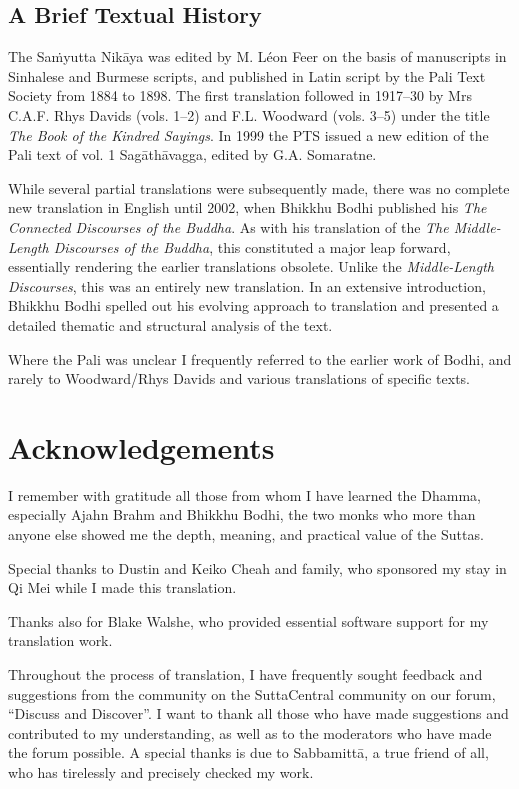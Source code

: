 \documentclass[12pt,openany]{book}%
\begin{document}
\section*{A Brief Textual History}

The \textsanskrit{Saṁyutta} \textsanskrit{Nikāya} was edited by M. Léon Feer on the basis of manuscripts in Sinhalese and Burmese scripts, and published in Latin script by the Pali Text Society from 1884 to 1898. The first translation followed in 1917–30 by Mrs C.A.F. Rhys Davids (vols. 1–2) and F.L. Woodward (vols. 3–5) under the title \textit{The Book of the Kindred Sayings}. In 1999 the PTS issued a new edition of the Pali text of vol. 1 \textsanskrit{Sagāthāvagga}, edited by G.A. Somaratne.

While several partial translations were subsequently made, there was no complete new translation in English until 2002, when Bhikkhu Bodhi published his \textit{The Connected Discourses of the Buddha}. As with his translation of the \textit{The Middle-Length Discourses of the Buddha}, this constituted a major leap forward, essentially rendering the earlier translations obsolete. Unlike the \textit{Middle-Length Discourses}, this was an entirely new translation. In an extensive introduction, Bhikkhu Bodhi spelled out his evolving approach to translation and presented a detailed thematic and structural analysis of the text.

Where the Pali was unclear I frequently referred to the earlier work of Bodhi, and rarely to Woodward/Rhys Davids and various translations of specific texts.

%
\chapter*{Acknowledgements}

I remember with gratitude all those from whom I have learned the Dhamma, especially Ajahn Brahm and Bhikkhu Bodhi, the two monks who more than anyone else showed me the depth, meaning, and practical value of the Suttas.

Special thanks to Dustin and Keiko Cheah and family, who sponsored my stay in Qi Mei while I made this translation.

Thanks also for Blake Walshe, who provided essential software support for my translation work.

Throughout the process of translation, I have frequently sought feedback and suggestions from the community on the SuttaCentral community on our forum, “Discuss and Discover”. I want to thank all those who have made suggestions and contributed to my understanding, as well as to the moderators who have made the forum possible. A special thanks is due to \textsanskrit{Sabbamittā}, a true friend of all, who has tirelessly and precisely checked my work.
\end{document}
